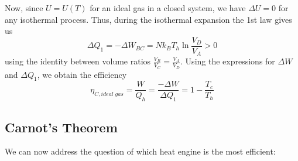 \documentclass[12pt, a4paper, oneside, openright, titlepage]{book}
\begin{document}
\begin{eg}
\begin{equation*}
    \end{equation*}
    Now, since $U = U(T)$ for an ideal gas in a closed system, we have $\Delta U = 0$ for any isothermal process. Thus, during the isothermal expansion the 1st law gives us \begin{equation*}
        \Delta Q_1 = -\Delta W_{BC} = Nk_BT_h\ln\frac{V_D}{V_A} > 0
    \end{equation*}
    using the identity between volume ratios $\frac{V_B}{V_C} = \frac{V_A}{V_D}$. Using the expressions for $\Delta W$ and $\Delta Q_1$, we obtain the efficiency \begin{equation*}
        \eta_{C,ideal\;gas} = \frac{W}{Q_h} = \frac{-\Delta W}{\Delta Q_1} = 1 - \frac{T_c}{T_h}
    \end{equation*}
\end{eg}

\subsection{Carnot's Theorem}

We can now address the question of which heat engine is the most efficient: 
\end{document}
